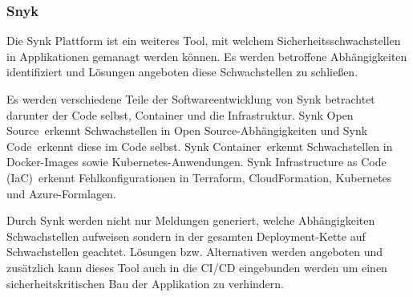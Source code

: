 \subsubsection{Snyk} \label{sec:Snyk}
    Die Synk Plattform ist ein weiteres Tool, mit welchem Sicherheitsschwachstellen in Applikationen gemanagt werden können. %
    Es werden betroffene Abhängigkeiten identifiziert und Lösungen angeboten diese Schwachstellen zu schließen.

    Es werden verschiedene Teile der Softwareentwicklung von Synk betrachtet darunter der Code selbst, Container und die Infrastruktur.
    \glqq Synk Open Source\grqq~erkennt Schwachstellen in \glqq Open Source\grqq-Abhängigkeiten und \glqq Synk Code\grqq~erkennt diese im Code selbst.
    \glqq Synk Container\grqq~erkennt Schwachstellen in Docker-Images sowie Kubernetes-Anwendungen.
    \glqq Synk Infrastructure as Code (IaC)\grqq~erkennt Fehlkonfigurationen in Terraform, CloudFormation, Kubernetes und Azure-Formlagen.

    Durch Synk werden nicht nur Meldungen generiert, welche Abhängigkeiten Schwachstellen aufweisen sondern in der gesamten Deployment-Kette auf Schwachstellen geachtet.
    Lösungen bzw. Alternativen werden angeboten und zusätzlich kann dieses Tool auch in die CI/CD eingebunden werden um einen sicherheitskritischen Bau der Applikation zu verhindern.   